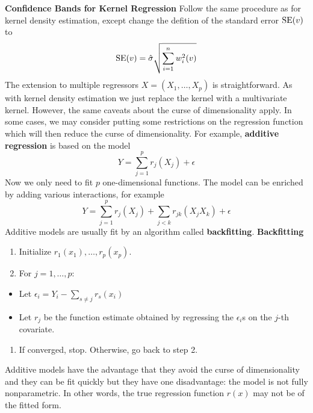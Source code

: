 \textbf{Confidence Bands for Kernel Regression}
Follow the same procedure as for kernel density estimation, except change the defition of the standard error \(\operatorname{\mathrm{SE}} (v)\) to
\[
\operatorname{\mathrm{SE}} (v) = \hat{\sigma} \sqrt{\sum_{i=1}^{n} w^{2}_{i}(v)}
\]
The extension to multiple regressors \(X = (X_{1}, \dots, X_p)\) is straightforward. As with kernel density estimation we just replace the kernel with a multivariate kernel. However, the same caveats about the curse of dimensionality apply.
In some cases, we may consider putting some restrictions on the regression function which will then reduce the curse of dimensionality. For example, \textbf{additive regression} is based on the model
\[
Y = \sum_{j=1}^p r_{j}(X_{j}) + \epsilon
\]
Now we only need to fit \(p\) one-dimensional functions. The model can be enriched by adding various interactions, for example
\[
Y = \sum_{j=1}^p r_{j}(X_{j}) + \sum_{j < k} r_{jk}(X_{j} X_{k}) + \epsilon
\]
Additive models are usually fit by an algorithm called \textbf{backfitting}.
\textbf{Backfitting}
\begin{enumerate}[tightlist,label={\arabic*.}]
\item
  Initialize \(r_{1}(x_{1}), \dots, r_p(x_p)\).
\item
  For \(j = 1, \dots, p\):
\end{enumerate}
\begin{itemize}[tightlist]
\item
  Let \(\epsilon_{i} = Y_{i} - \sum_{s \neq j} r_s(x_{i})\)\\
\item
  Let \(r_{j}\) be the function estimate obtained by regressing the
  \(\epsilon_{i}\)s on the \(j\)-th covariate.
\end{itemize}
\begin{enumerate}[tightlist,label={\arabic*.},resume]
\item
  If converged, stop. Otherwise, go back to step 2.
\end{enumerate}
Additive models have the advantage that they avoid the curse of dimensionality and they can be fit quickly but they have one disadvantage: the model is not fully nonparametric. In other words, the true regression function \(r(x)\) may not be of the fitted form.

